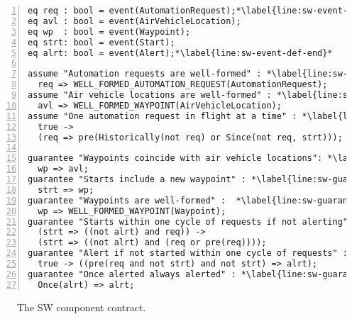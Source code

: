 \newsavebox{\sw}
\begin{lrbox}{\sw}
\begin{lstlisting}[style=agree,numbers=left]
eq req : bool = event(AutomationRequest);*\label{line:sw-event-def-start}*
eq avl : bool = event(AirVehicleLocation);
eq wp  : bool = event(Waypoint);
eq strt: bool = event(Start);
eq alrt: bool = event(Alert);*\label{line:sw-event-def-end}*

assume "Automation requests are well-formed" : *\label{line:sw-assume-1}*
  req => WELL_FORMED_AUTOMATION_REQUEST(AutomationRequest);
assume "Air vehicle locations are well-formed" : *\label{line:sw-assume-2}*
  avl => WELL_FORMED_WAYPOINT(AirVehicleLocation);
assume "One automation request in flight at a time" : *\label{line:sw-assume-3}*
  true ->
  (req => pre(Historically(not req) or Since(not req, strt)));

guarantee "Waypoints coincide with air vehicle locations": *\label{line:sw-guarantee-1}*
  wp => avl;
guarantee "Starts include a new waypoint" : *\label{line:sw-guarantee-2}*
  strt => wp;
guarantee "Waypoints are well-formed" :  *\label{line:sw-guarantee-3}*
  wp => WELL_FORMED_WAYPOINT(Waypoint);
guarantee "Starts within one cycle of requests if not alerting" : *\label{line:sw-guarantee-4}*
  (strt => ((not alrt) and req)) ->
  (strt => ((not alrt) and (req or pre(req))));
guarantee "Alert if not started within one cycle of requests" : *\label{line:sw-guarantee-5}*
  true -> ((pre(req and not strt) and not strt) => alrt);
guarantee "Once alerted always alerted" : *\label{line:sw-guarantee-6}*
  Once(alrt) => alrt;
\end{lstlisting}
\end{lrbox}

\begin{figure}
  \begin{center}
    \scalebox{0.62}{\usebox{\sw}}
  \end{center}
  \caption{The SW component contract.}
  \label{fig:sw}
\end{figure}



